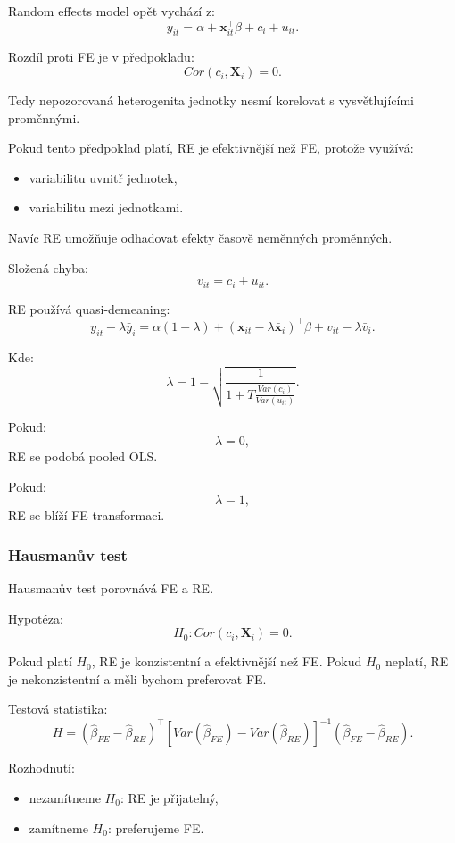 Random effects model opět vychází z:
\[
    y_{it}
    =
    \alpha
    +
    \mathbf x_{it}^\top\beta
    +
    c_i
    +
    u_{it}.
\]

Rozdíl proti FE je v předpokladu:
\[
    Cor(c_i,\mathbf X_i)=0.
\]

Tedy nepozorovaná heterogenita jednotky nesmí korelovat s vysvětlujícími proměnnými.

Pokud tento předpoklad platí, RE je efektivnější než FE, protože využívá:
\begin{itemize}
    \item variabilitu uvnitř jednotek,
    \item variabilitu mezi jednotkami.
\end{itemize}

Navíc RE umožňuje odhadovat efekty časově neměnných proměnných.

Složená chyba:
\[
    v_{it}=c_i+u_{it}.
\]

RE používá quasi-demeaning:
\[
    y_{it}-\lambda\bar y_i
    =
    \alpha(1-\lambda)
    +
    (\mathbf x_{it}-\lambda\bar{\mathbf x}_i)^\top\beta
    +
    v_{it}-\lambda\bar v_i.
\]

Kde:
\[
    \lambda
    =
    1
    -
    \sqrt{
    \frac{1}{1+T\frac{Var(c_i)}{Var(u_{it})}}
    }.
\]

Pokud:
\[
    \lambda=0,
\]
RE se podobá pooled OLS.

Pokud:
\[
    \lambda=1,
\]
RE se blíží FE transformaci.

\subsubsection{Hausmanův test}

Hausmanův test porovnává FE a RE.

Hypotéza:
\[
    H_0: Cor(c_i,\mathbf X_i)=0.
\]

Pokud platí $H_0$, RE je konzistentní a efektivnější než FE.
Pokud $H_0$ neplatí, RE je nekonzistentní a měli bychom preferovat FE.

Testová statistika:
\[
    H
    =
    (\hat\beta_{FE}-\hat\beta_{RE})^\top
    \left[
    Var(\hat\beta_{FE})-Var(\hat\beta_{RE})
    \right]^{-1}
    (\hat\beta_{FE}-\hat\beta_{RE}).
\]

Rozhodnutí:
\begin{itemize}
    \item nezamítneme $H_0$: RE je přijatelný,
    \item zamítneme $H_0$: preferujeme FE.
\end{itemize}

